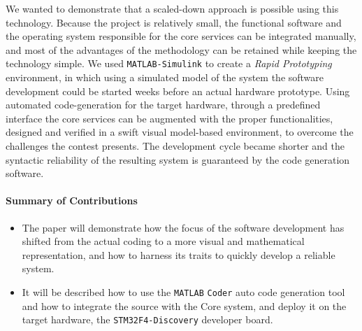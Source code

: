 
We wanted to demonstrate that a scaled-down approach is possible using this technology. Because the project is relatively small, the functional software and the operating system responsible for the core services can be integrated manually, and most of the advantages of the methodology can be retained while keeping the technology simple. We used \verb!MATLAB-Simulink! to create a \emph{Rapid Prototyping} environment, in which using a simulated model of the system the software development could be started weeks before an actual hardware prototype. Using automated code-generation for the target hardware, through a predefined interface the core services can be augmented with the proper functionalities, designed and verified in a swift visual model-based environment, to overcome the challenges the contest presents. The development cycle became shorter and the syntactic reliability of the resulting system is guaranteed by the code generation software.

\paragraph{Summary of Contributions}
\begin{itemize}
\item The paper will demonstrate how the focus of the software development has shifted from the actual coding to a more visual and mathematical representation, and how to harness its traits to quickly develop a reliable system.
\item It will be described how to use the \verb!MATLAB! \verb!Coder! auto code generation tool and how to integrate the source with the Core system, and deploy it on the target hardware, the \verb!STM32F4-Discovery! developer board.
\end{itemize}